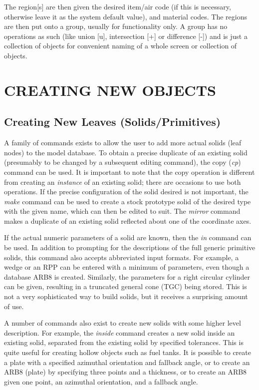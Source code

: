 The region[s] are then given the desired item/air code (if this is
necessary, otherwise leave it as the system default value), and material
codes.  The regions are then put onto a group, usually for functionality only.
A group has no operations as such (like union [u], intersection [+] or
difference [-]) and is just a collection of objects for convenient naming
of a whole screen or collection of objects.
\chapter{CREATING NEW OBJECTS}

\section{Creating New Leaves (Solids/Primitives)}

A family of commands exists to allow the user to
add more actual solids (leaf nodes) to the model database.
To obtain a precise duplicate of an existing solid (presumably to be
changed by a subsequent editing command), the copy ({\em cp}) command
can be used.  It is important to note that the copy operation is
different from creating an {\em instance} of an existing solid;
there are occasions to use both operations.
If the precise configuration of the solid desired is not important, the
{\em make} command can be used to create a stock prototype solid of the
desired type with the given name, which can then be edited to suit.
The {\em mirror} command makes a
duplicate of an existing solid reflected about
one of the coordinate axes.

If the actual numeric parameters of a solid are known, then the {\em in}
command can be used.  In addition to prompting for the descriptions of
the full generic primitive solids, this command also accepts
abbreviated input formats.  For example, a wedge or an RPP can be entered
with a minimum of parameters, even though a database ARB8 is created.
Similarly, the parameters for a right circular cylinder can be given,
resulting in a truncated general cone (TGC) being stored.
This is not a very sophisticated way to build solids, but it receives
a surprising amount of use.

A number of commands also exist to create new solids with some
higher level description.  For example, the {\em inside} command
creates a new solid inside an existing solid, separated from the
existing solid by specified tolerances.  This is quite useful for
creating hollow objects such as fuel tanks.
It is possible to create a plate with a specified
azimuthal orientation and fallback angle, or to create an ARB8 (plate)
by specifying three points and a thickness, or to create an ARB8
given one point, an azimuthal orientation, and a fallback angle.

